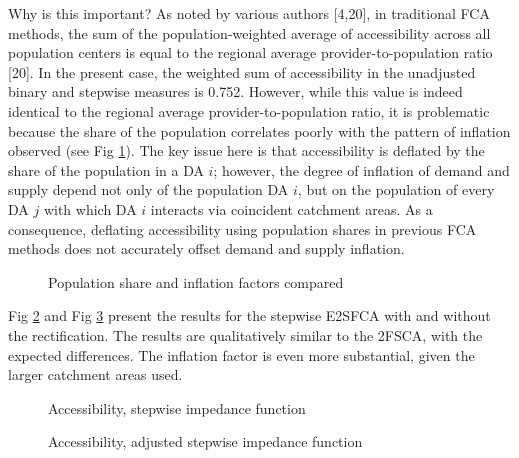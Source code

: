 \documentclass[10pt,letterpaper]{article}
\begin{document}
Why is this important? As noted by various authors {[}4,20{]}, in
traditional FCA methods, the sum of the population-weighted average of
accessibility across all population centers is equal to the regional
average provider-to-population ratio {[}20{]}. In the present case, the
weighted sum of accessibility in the unadjusted binary and stepwise
measures is 0.752. However, while this value is indeed identical to the
regional average provider-to-population ratio, it is problematic because
the share of the population correlates poorly with the pattern of
inflation observed (see Fig
\ref{fig:fig10-map-pop-share-inflation-comparison-binary}). The key
issue here is that accessibility is deflated by the share of the
population in a DA \(i\); however, the degree of inflation of demand and
supply depend not only of the population DA \(i\), but on the population
of every DA \(j\) with which DA \(i\) interacts via coincident catchment
areas. As a consequence, deflating accessibility using population shares
in previous FCA methods does not accurately offset demand and supply
inflation.

\begin{figure}[htbp]
\centering
\caption{\label{fig:fig10-map-pop-share-inflation-comparison-binary}Population
share and inflation factors compared}
\end{figure}

Fig \ref{fig:fig11-map-accessibility-stepwise} and Fig
\ref{fig:fig12-map-accessibility-stepwise-adjusted} present the results
for the stepwise E2SFCA with and without the rectification. The results
are qualitatively similar to the 2FSCA, with the expected differences.
The inflation factor is even more substantial, given the larger
catchment areas used.

\begin{figure}[htbp]
\centering
\caption{\label{fig:fig11-map-accessibility-stepwise}Accessibility,
stepwise impedance function}
\end{figure}

\begin{figure}[htbp]
\centering
\caption{\label{fig:fig12-map-accessibility-stepwise-adjusted}Accessibility,
adjusted stepwise impedance function}
\end{figure}
\end{document}
